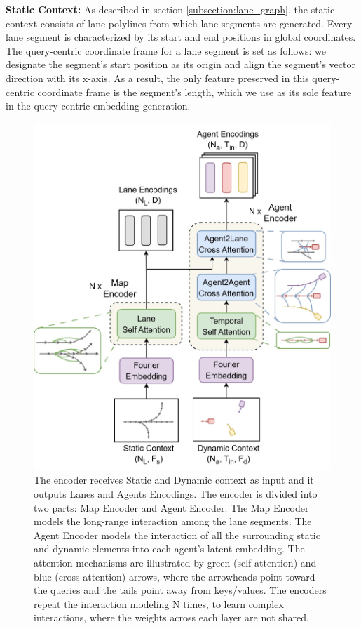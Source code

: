 \noindent\textbf{Static Context:} As described in section \ref{subsection:lane_graph}, the static context consists of lane polylines from which lane segments are generated. Every lane segment is characterized by its start and end positions in global coordinates. The query-centric coordinate frame for a lane segment is set as follows: we designate the segment’s start position as its origin and align the segment's vector direction with its x-axis. As a result, the only feature preserved in this query-centric coordinate frame is the segment's length, which we use as its sole feature in the query-centric embedding generation.

\begin{figure}
    \centering
    \includegraphics[width=1\linewidth]{images/lane_based_prediction_encoder_paper.jpg}
    \caption{The encoder receives Static and Dynamic context as input and it outputs Lanes and Agents Encodings. The encoder is divided into two parts: Map Encoder and Agent Encoder. The Map Encoder models the long-range interaction among the lane segments. The Agent Encoder models the interaction of all the surrounding static and dynamic elements into each agent's latent embedding. The attention mechanisms are illustrated by green (self-attention) and blue (cross-attention) arrows, where the arrowheads point toward the queries and the tails point away from keys/values. The encoders repeat the interaction modeling N times, to learn complex interactions, where the weights across each layer are not shared.}
    \label{fig:encoder}
\end{figure}

